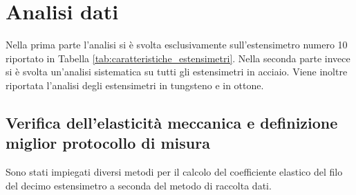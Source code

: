 \documentclass[a4paper,11pt,oneside]{article}
\begin{document}
\section{Analisi dati}
Nella prima parte l'analisi si è svolta esclusivamente sull'estensimetro numero 10 riportato in Tabella \ref{tab:caratteristiche_estensimetri}. Nella seconda parte invece si è svolta un'analisi sistematica su tutti gli estensimetri in acciaio. Viene inoltre riportata l'analisi degli estensimetri in tungsteno e in ottone.

\subsection{Verifica dell'elasticità meccanica e definizione miglior protocollo di misura}\label{sec:prima_parte}
Sono stati impiegati diversi metodi per il calcolo del coefficiente elastico del filo del decimo estensimetro a seconda del metodo di raccolta dati.\\
\end{document}
